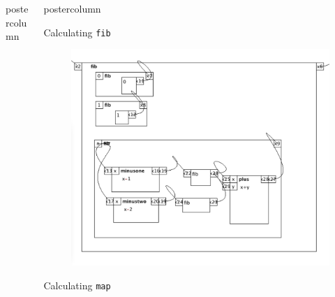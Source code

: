 \documentclass[final]{beamer}
\newlength{\columnheight}
\begin{document}
\begin{frame}[fragile]
\begin{columns}[T]
\begin{column}{.3\textwidth}
\begin{beamercolorbox}[wd=\textwidth]{postercolumn}
            \end{beamercolorbox}


        \end{column}

        \begin{column}{.35\textwidth}
            \begin{beamercolorbox}[wd=\textwidth]{postercolumn}
                \begin{block}{Calculating \texttt{fib}}
                    \begin{figure}
                        \includegraphics[width=1\textwidth]{fib-diagram.pdf}
                    \end{figure}
                \end{block}
                \begin{block}{Calculating \texttt{map}}
                    \begin{figure}

\end{figure}
\end{block}
\end{beamercolorbox}
\end{column}
\end{columns}
\end{frame}
\end{document}
